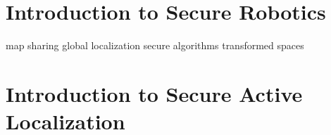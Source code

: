 \section{Introduction to Secure Robotics}
\label{sec:sec-robo-intro}

map sharing
global localization
secure algorithms
transformed spaces

\section{Introduction to Secure Active Localization}
\label{sec:sec-local-intro}

